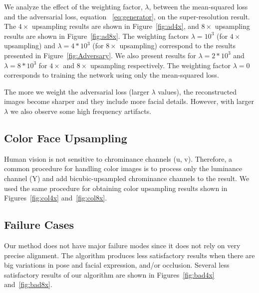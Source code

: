\documentclass[runningheads]{llncs}
\begin{document}
We analyze the effect of the weighting factor, $\lambda$, between the mean-squared loss and the adversarial loss, equation ~\eqref{eq:generator}, on the super-resolution result. The $4 \times$ upsampling results are shown in Figure~\ref{fig:ad4x}, and $8 \times$ upsampling results are shown in Figure~\ref{fig:ad8x}. The weighting factors $\lambda=10^3$  (for $4 \times$ upsampling) and $\lambda=4*10^3$ (for $8 \times$ upsampling) correspond to the results presented in Figure~\ref{fig:Adversary}.  We also present results for $\lambda=2*10^3$ and $\lambda=8*10^3$ for $4 \times$ and  $8 \times$ upsampling respectively. The weighting factor  $\lambda=0$ corresponds to training the network using only the mean-squared loss.

The more we weight the adversarial loss (larger $\lambda$ values), the reconstructed images become sharper and they include more facial details. However, with larger $\lambda$ we also observe some high frequency artifacts.


\subsection{Color Face Upsampling}

Human vision is not sensitive to chrominance channels (u, v). Therefore, a common procedure for handling color images is to process only the luminance channel (Y) and add bicubic-upsampled chrominance channels to the result. We used the same procedure for obtaining color upsampling results shown in Figures~\ref{fig:col4x} and~\ref{fig:col8x}.


\subsection{Failure Cases}

Our method does not have major failure modes since it does not rely on very precise alignment. The algorithm produces less satisfactory results when there are big variations in pose and facial expression, and/or occlusion. Several less satisfactory results of our algorithm are shown in Figures~\ref{fig:bad4x} and~\ref{fig:bad8x}.
\end{document}

